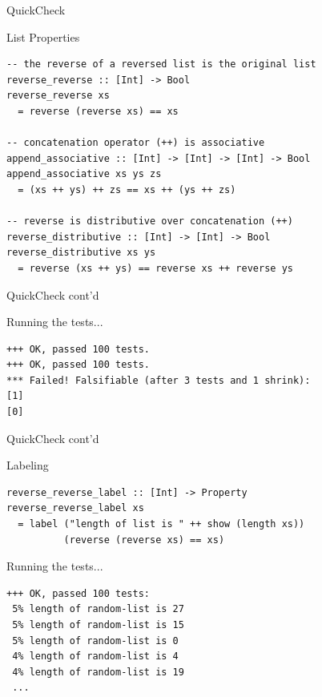 \documentclass{beamer} %
\begin{document}
\begin{frame}[fragile]{QuickCheck}
\begin{block}{List Properties}
\begin{verbatim}
-- the reverse of a reversed list is the original list
reverse_reverse :: [Int] -> Bool
reverse_reverse xs 
  = reverse (reverse xs) == xs

-- concatenation operator (++) is associative
append_associative :: [Int] -> [Int] -> [Int] -> Bool
append_associative xs ys zs 
  = (xs ++ ys) ++ zs == xs ++ (ys ++ zs)

-- reverse is distributive over concatenation (++)
reverse_distributive :: [Int] -> [Int] -> Bool
reverse_distributive xs ys 
  = reverse (xs ++ ys) == reverse xs ++ reverse ys
\end{verbatim}
\end{block}
\end{frame}

\begin{frame}[fragile]{QuickCheck cont'd}
\begin{block}{Running the tests...}
\begin{footnotesize}
\begin{verbatim}
+++ OK, passed 100 tests.
+++ OK, passed 100 tests.
*** Failed! Falsifiable (after 3 tests and 1 shrink):     
[1]
[0]
\end{verbatim}
\end{footnotesize}
\end{block}
\end{frame}

\begin{frame}[fragile]{QuickCheck cont'd}
\begin{block}{Labeling}
\begin{verbatim}
reverse_reverse_label :: [Int] -> Property
reverse_reverse_label xs  
  = label ("length of list is " ++ show (length xs)) 
          (reverse (reverse xs) == xs)
\end{verbatim}
\end{block}

\begin{block}{Running the tests...}
\begin{footnotesize}
\begin{verbatim}
+++ OK, passed 100 tests:
 5% length of random-list is 27
 5% length of random-list is 15
 5% length of random-list is 0
 4% length of random-list is 4
 4% length of random-list is 19
 ...
\end{verbatim}
\end{footnotesize}
\end{block}
\end{frame}
\end{document}
